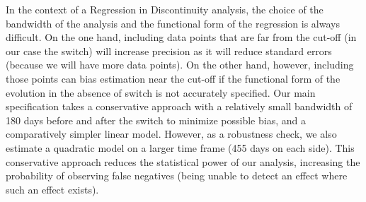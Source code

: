 \documentclass[conference]{IEEEtran}
\begin{document}
In the context of a Regression in Discontinuity analysis, the choice of the bandwidth of the analysis and the functional form of the regression is always difficult. On the one hand, including data points that are far from the cut-off (in our case the switch) will increase precision as it will reduce standard errors (because we will have more data points). On the other hand, however, including those points can bias estimation near the cut-off if the functional form of the evolution in the absence of switch is not accurately specified. Our main specification takes a conservative approach with a relatively small bandwidth of 180 days before and after the switch to minimize possible bias, and a comparatively simpler linear model. However, as a robustness check, we also estimate a quadratic model on a larger time frame (455 days on each side). This conservative approach reduces the statistical power of our analysis, increasing the probability of observing false negatives (being unable to detect an effect where such an effect exists).
\end{document}
